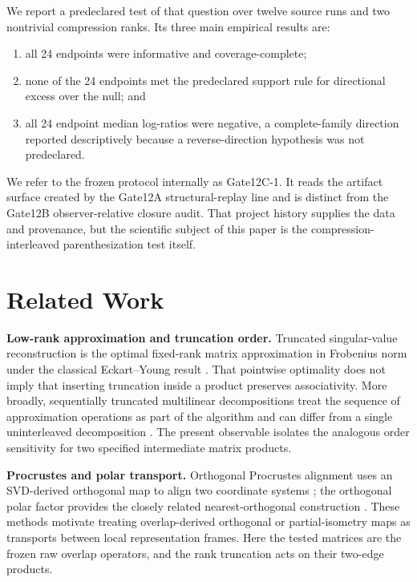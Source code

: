 \documentclass[11pt]{article}
\begin{document}
We report a predeclared test of that question over twelve source runs and two
nontrivial compression ranks. Its three main empirical results are:

\begin{enumerate}
    \item all 24 endpoints were informative and coverage-complete;
    \item none of the 24 endpoints met the predeclared support rule for
    directional excess over the null; and
    \item all 24 endpoint median log-ratios were negative, a complete-family
    direction reported descriptively because a reverse-direction hypothesis
    was not predeclared.
\end{enumerate}

We refer to the frozen protocol internally as Gate12C-1. It reads the artifact
surface created by the Gate12A structural-replay line and is distinct from the
Gate12B observer-relative closure audit. That project history supplies the data
and provenance, but the scientific subject of this paper is the
compression-interleaved parenthesization test itself.

\section{Related Work}
\label{sec:related-work}

\textbf{Low-rank approximation and truncation order.}
Truncated singular-value reconstruction is the optimal fixed-rank matrix
approximation in Frobenius norm under the classical Eckart--Young result
\cite{eckart1936approximation}. That pointwise optimality does not imply that
inserting truncation inside a product preserves associativity. More broadly,
sequentially truncated multilinear decompositions treat the sequence of
approximation operations as part of the algorithm and can differ from a single
uninterleaved decomposition \cite{vannieuwenhoven2012truncation}. The present
observable isolates the analogous order sensitivity for two specified
intermediate matrix products.

\textbf{Procrustes and polar transport.}
Orthogonal Procrustes alignment uses an SVD-derived orthogonal map to align two
coordinate systems \cite{schonemann1966procrustes}; the orthogonal polar factor
provides the closely related nearest-orthogonal construction
\cite{higham1986polar}. These methods motivate treating overlap-derived
orthogonal or partial-isometry maps as transports between local representation
frames. Here the tested matrices are the frozen raw overlap operators, and the
rank truncation acts on their two-edge products.
\end{document}

